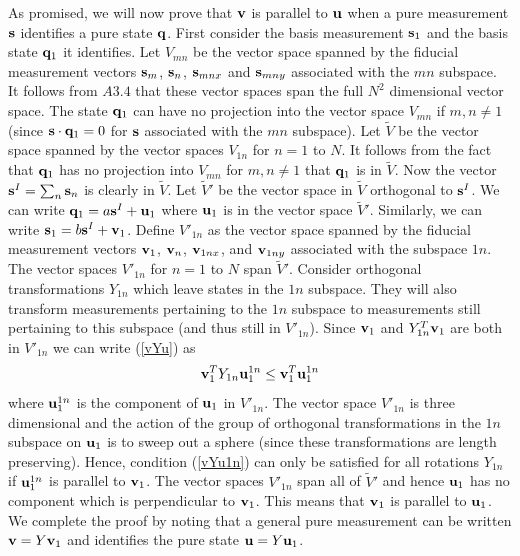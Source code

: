 \documentclass[12pt]{article}
\begin{document}
As promised, we will now prove that ${\bf v}$ is parallel to ${\bf u}$
when a pure
measurement ${\bf s}$ identifies a pure state ${\bf q}$.  First consider
the basis measurement ${\bf s}_1$ and the basis state ${\bf q}_1$ it
identifies.  Let $V_{mn}$ be the vector space spanned by the fiducial
measurement
vectors ${\bf s}_m$, ${\bf s}_n$, ${\bf s}_{mnx}$ and ${\bf s}_{mny}$
associated with the $mn$ subspace.  It follows from $A3.4$ that these
vector spaces span the full $N^2$ dimensional vector space.  The state
${\bf q}_1$ can have no projection into the vector space $V_{mn}$ if
$m,n\not=1$ (since ${\bf s}\cdot{\bf q}_1=0$ for ${\bf s}$ associated
with the $mn$ subspace).  Let $\widetilde{V}$ be the vector space
spanned by the vector spaces $V_{1n}$ for $n=1$ to $N$.  It follows from
the fact that ${\bf q}_1$ has no projection into $V_{mn}$ for
$m,n\not=1$ that ${\bf q}_1$
is in $\widetilde{V}$. Now the vector ${\bf s}^I=\sum_n {\bf s}_n$ is
clearly in $\widetilde{V}$. Let $\widetilde{V}'$ be the vector space in
$\widetilde{V}$ orthogonal to ${\bf s}^I$.  We can write ${\bf q}_1=a{\bf
s}^I+{\bf u}_1$ where ${\bf u}_1$ is in the vector space
$\widetilde{V}'$.  Similarly, we can write ${\bf s}_1=b{\bf s}^I+{\bf
v}_1$.
Define $V'_{1n}$ as the vector space spanned by the fiducial measurement
vectors ${\bf v}_1$, ${\bf v}_n$, ${\bf v}_{1nx}$, and ${\bf v}_{1ny}$
associated with the subspace $1n$.  The vector spaces $V'_{1n}$ for
$n=1$ to $N$ span $\widetilde{V}'$.  Consider
orthogonal transformations $Y_{1n}$
which leave states in the $1n$ subspace. They will also transform
measurements pertaining to the $1n$ subspace to measurements still
pertaining to this subspace (and thus still in $V'_{1n}$).  Since ${\bf
v}_1$ and $Y_{1n}^T{\bf v}_1$ are both in $V'_{1n}$ we can write
(\ref{vYu}) as
\begin{equation}\label{vYu1n}
{\bf v}_1^T Y_{1n} {\bf u}_1^{1n} \leq {\bf v}_1^T {\bf u}_1^{1n}
\end{equation}
where ${\bf u}_1^{1n}$ is the component of ${\bf u}_1$ in $V'_{1n}$.
The vector space $V'_{1n}$ is three dimensional
and the action of the group of orthogonal
transformations in the $1n$ subspace on ${\bf u}_1$ is to sweep out a
sphere (since these transformations are length preserving).
Hence, condition (\ref{vYu1n}) can only be satisfied for all rotations
$Y_{1n}$ if ${\bf u}_1^{1n}$ is parallel to ${\bf v}_1$.
The vector spaces $V'_{1n}$ span all of $\widetilde{V}'$ and
hence ${\bf u}_1$ has no component which is perpendicular to ${\bf
v}_1$.  This means that ${\bf v}_1$ is parallel to ${\bf u}_1$.  We
complete the proof by noting that a
general pure measurement can be written ${\bf v}=Y{\bf v}_1$ and
identifies the pure state ${\bf u}=Y{\bf u}_1$.
\end{document}
